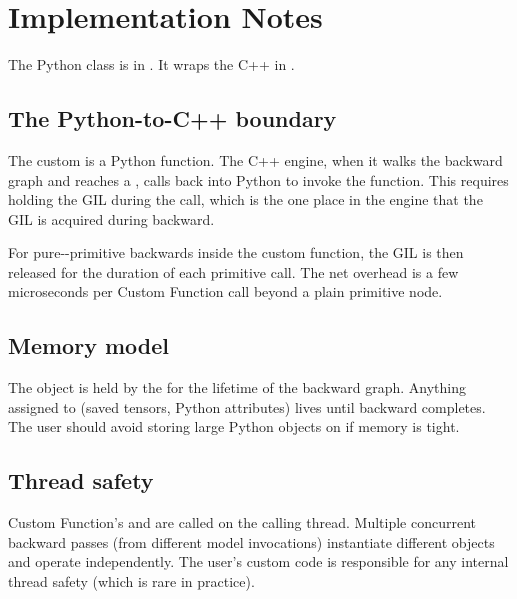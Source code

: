 \section{Implementation Notes}
\label{sec:custom_functions:impl}

The Python  class is in
. It wraps the C++
 in .

\subsection{The Python-to-C++ boundary}
\label{ssec:custom_functions:py_cpp_boundary}

The custom  is a Python function. The C++ engine,
when it walks the backward graph and reaches a
, calls back into Python to invoke the
function. This requires holding the GIL during the call, which is
the one place in the engine that the GIL is acquired during
backward.

For pure-\Lucid-primitive backwards inside the custom function,
the GIL is then released for the duration of each primitive call.
The net overhead is a few microseconds per Custom Function call
beyond a plain primitive node.

\subsection{Memory model}
\label{ssec:custom_functions:memory}

The  object is held by the 
for the lifetime of the backward graph. Anything assigned to
 (saved tensors, Python attributes) lives until backward
completes. The user should avoid storing large Python objects
on  if memory is tight.

\subsection{Thread safety}
\label{ssec:custom_functions:thread_safety}

Custom Function's  and  are called
on the calling thread. Multiple concurrent backward passes (from
different model invocations) instantiate different 
objects and operate independently. The user's custom code is
responsible for any internal thread safety (which is rare in
practice).

